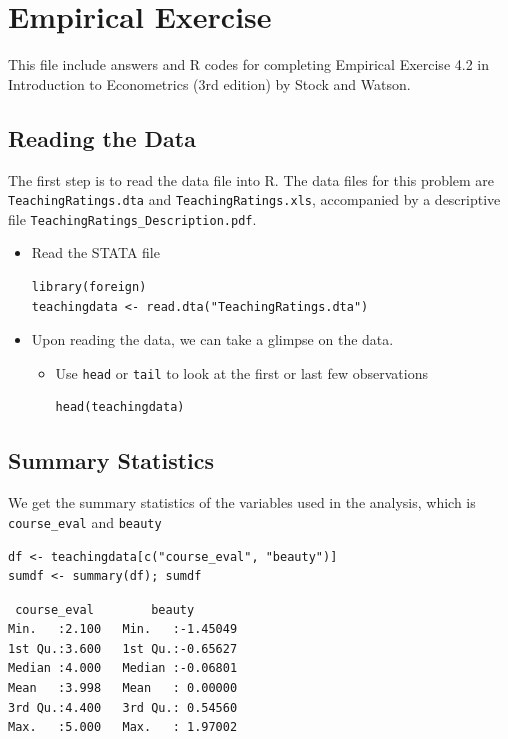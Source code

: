 \documentclass[a4paper,11pt]{article}
\begin{document}
\section{Empirical Exercise}
\label{sec:org4a93cca}
This file include answers and R codes for completing Empirical
Exercise 4.2 in Introduction to Econometrics (3rd edition) by Stock
and Watson.

\subsection*{Reading the Data}
\label{sec:org8c09ce2}

The first step is to read the data file into R. The data files for
this problem are \texttt{TeachingRatings.dta} and \texttt{TeachingRatings.xls},
accompanied by a descriptive file \texttt{TeachingRatings\_Description.pdf}.

\begin{itemize}
\item Read the STATA file

\begin{verbatim}
library(foreign)
teachingdata <- read.dta("TeachingRatings.dta")
\end{verbatim}

\item Upon reading the data, we can take a glimpse on the data.

\begin{itemize}
\item Use \texttt{head} or \texttt{tail} to look at the first or last few observations

\begin{verbatim}
head(teachingdata)
\end{verbatim}
\end{itemize}
\end{itemize}


\subsection*{Summary Statistics}
\label{sec:orgceb17b0}

We get the summary statistics of the variables used in the analysis,
which is \texttt{course\_eval} and \texttt{beauty}

\begin{verbatim}
df <- teachingdata[c("course_eval", "beauty")]
sumdf <- summary(df); sumdf
\end{verbatim}

\begin{verbatim}
 course_eval        beauty
Min.   :2.100   Min.   :-1.45049
1st Qu.:3.600   1st Qu.:-0.65627
Median :4.000   Median :-0.06801
Mean   :3.998   Mean   : 0.00000
3rd Qu.:4.400   3rd Qu.: 0.54560
Max.   :5.000   Max.   : 1.97002
\end{verbatim}
\end{document}
